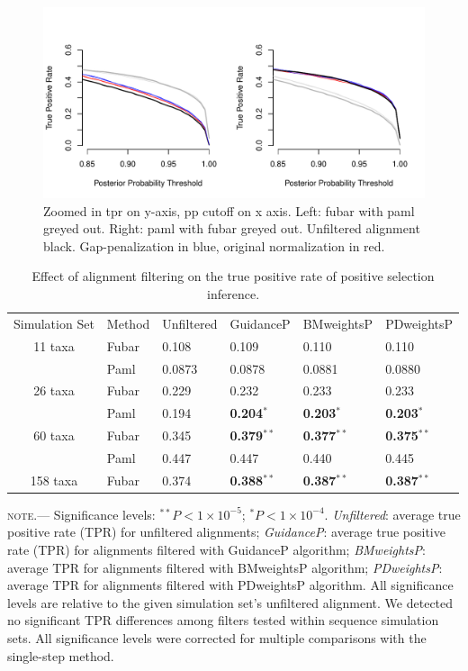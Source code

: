 \documentclass[10pt]{article}
\begin{document}
\begin{figure}[H]
\label{subtpr}
\centerline{\includegraphics[width=5in]{Figures/subtpr.pdf}}
\caption{Zoomed in tpr on y-axis, pp cutoff on x axis. Left: fubar with paml greyed out. Right: paml with fubar greyed out. Unfiltered alignment black. Gap-penalization in blue, original normalization in red.}
\end{figure}


\begin{table}[H]
\label{tab:casemodel}
\caption {Effect of alignment filtering on the true positive rate of positive selection inference.}
\begin{tabular}{c l l l l l}
\hline\noalign{\smallskip}
Simulation Set & Method & Unfiltered & GuidanceP & BMweightsP & PDweightsP \\ 
\noalign{\smallskip}\hline\noalign{\smallskip}
11 taxa  & Fubar & 0.108 & 0.109   & 0.110   & 0.110        \\
              & Paml &  0.0873 & 0.0878       &  0.0881        & 0.0880 \\
\hline
26 taxa   & Fubar &  0.229 & 0.232       & 0.233 & 0.233         \\
              & Paml & 0.194 &\textbf{0.204}$^{\ast}$ &\textbf{0.203}$^{\ast}$ & \textbf{0.203}$^{\ast}$   \\
\hline
60 taxa  & Fubar & 0.345 & \textbf{0.379}$^{\ast\ast}$ & \textbf{0.377}$^{\ast\ast}$ & \textbf{0.375}$^{\ast\ast}$  \\
              & Paml & 0.447 & 0.447 & 0.440 & 0.445  \\
\hline
158 taxa & Fubar & 0.374 & \textbf{0.388}$^{\ast\ast}$ & \textbf{0.387}$^{\ast\ast}$ & \textbf{0.387}$^{\ast\ast}$  \\
\hline
\end{tabular}
\newline
\textsc{note.}--- Significance levels: $^{\ast\ast} P < 1\times10^{-5}$; $^{\ast} P < 1\times10^{-4}$. \textit{Unfiltered}: average true positive rate (TPR) for unfiltered alignments; \textit{GuidanceP}: average true positive rate (TPR) for alignments filtered with GuidanceP algorithm; \textit{BMweightsP}: average TPR for alignments filtered with BMweightsP algorithm; \textit{PDweightsP}: average TPR for alignments filtered with PDweightsP algorithm. All significance levels are relative to the given simulation set's unfiltered alignment. We detected no significant TPR differences among filters tested within sequence simulation sets. All significance levels were corrected for multiple comparisons with the single-step method.
\end{table}
\end{document}
